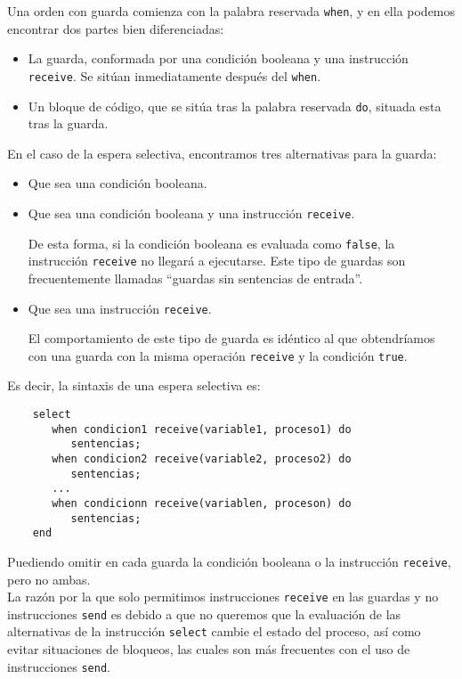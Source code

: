 Una orden con guarda comienza con la palabra reservada \verb|when|, y en ella podemos encontrar dos partes bien diferenciadas:
\begin{itemize}
    \item La guarda, conformada por una condición booleana y una instrucción \verb|receive|. Se sitúan inmediatamente después del \verb|when|.
    \item Un bloque de código, que se sitúa tras la palabra reservada \verb|do|, situada esta tras la guarda.
\end{itemize}
En el caso de la espera selectiva, encontramos tres alternativas para la guarda:
\begin{itemize}
    \item Que sea una condición booleana.
    \item Que sea una condición booleana y una instrucción \verb|receive|. 

        De esta forma, si la condición booleana es evaluada como \verb|false|, la instrucción \verb|receive| no llegará a ejecutarse.
        Este tipo de guardas son frecuentemente llamadas ``guardas sin sentencias de entrada''.
    \item Que sea una instrucción \verb|receive|. 

    El comportamiento de este tipo de guarda es idéntico al que obtendríamos con una guarda con la misma operación \verb|receive| y la condición \verb|true|.
\end{itemize}
Es decir, la sintaxis de una espera selectiva es:
\begin{verbatim}
    select
       when condicion1 receive(variable1, proceso1) do
          sentencias;
       when condicion2 receive(variable2, proceso2) do
          sentencias;
       ...
       when condicionn receive(variablen, proceson) do
          sentencias;
    end
\end{verbatim}
Puediendo omitir en cada guarda la condición booleana o la instrucción \verb|receive|, pero no ambas.\\

La razón por la que solo permitimos instrucciones \verb|receive| en las guardas y no instrucciones \verb|send| es debido a que no queremos que la evaluación de las alternativas de la instrucción \verb|select| cambie el estado del proceso, así como evitar situaciones de bloqueos, las cuales son más frecuentes con el uso de instrucciones \verb|send|.

